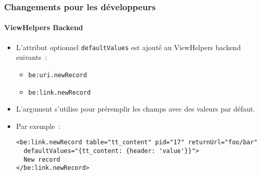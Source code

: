 %

\begin{frame}[fragile]
	\frametitle{Changements pour les développeurs}
	\framesubtitle{ViewHelpers Backend}

	\lstset{basicstyle=\tiny\ttfamily}

	\begin{itemize}
		\item L'attribut optionnel \texttt{defaultValues} est ajouté au ViewHelpers backend suivants~:

			\begin{itemize}\smaller
				\item \texttt{be:uri.newRecord}
				\item \texttt{be:link.newRecord}
			\end{itemize}\normalsize

		\item L'argument s'utilise pour préremplir les champs avec des valeurs par défaut.
		\item Par exemple~:
\begin{lstlisting}
<be:link.newRecord table="tt_content" pid="17" returnUrl="foo/bar"
  defaultValues="{tt_content: {header: 'value'}}">
  New record
</be:link.newRecord>
\end{lstlisting}
	\end{itemize}

\end{frame}

